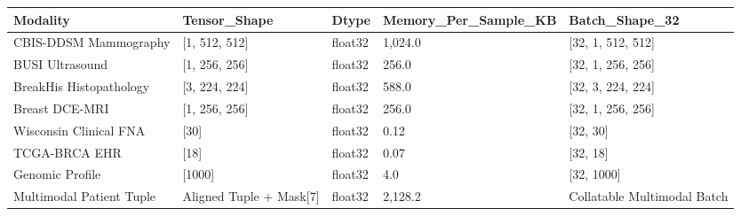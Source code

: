 \begin{tabular}{lllll}
\toprule
Modality & Tensor_Shape & Dtype & Memory_Per_Sample_KB & Batch_Shape_32 \\
\midrule
CBIS-DDSM Mammography & [1, 512, 512] & float32 & 1,024.0 & [32, 1, 512, 512] \\
BUSI Ultrasound & [1, 256, 256] & float32 & 256.0 & [32, 1, 256, 256] \\
BreakHis Histopathology & [3, 224, 224] & float32 & 588.0 & [32, 3, 224, 224] \\
Breast DCE-MRI & [1, 256, 256] & float32 & 256.0 & [32, 1, 256, 256] \\
Wisconsin Clinical FNA & [30] & float32 & 0.12 & [32, 30] \\
TCGA-BRCA EHR & [18] & float32 & 0.07 & [32, 18] \\
Genomic Profile & [1000] & float32 & 4.0 & [32, 1000] \\
Multimodal Patient Tuple & Aligned Tuple + Mask[7] & float32 & 2,128.2 & Collatable Multimodal Batch \\
\bottomrule
\end{tabular}

